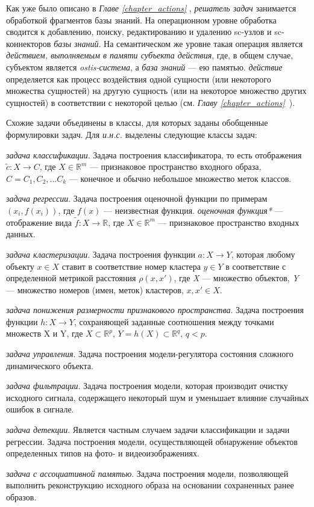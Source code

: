 Как уже было описано в \textit{Главе \ref{chapter_actions} }, \textit{решатель задач} занимается обработкой фрагментов базы знаний. На операционном уровне обработка сводится к добавлению, поиску, редактированию и удалению sc-узлов и sc-коннекторов \textit{базы знаний}. На семантическом же уровне такая операция является \textit{действием, выполняемым в памяти субъекта действия}, где, в общем случае, субъектом является \textit{ostis-система}, а \textit{база знаний} --- ею памятью. \textit{действие} определяется как процесс воздействия одной сущности (или некоторого множества сущностей) на другую сущность (или на некоторое множество других сущностей) в соответствии с некоторой целью (см. \textit{Главу \ref{chapter_actions}~}).

Схожие задачи объединены в классы, для которых заданы обобщенные формулировки задач. Для \textit{и.н.с.} выделены следующие классы задач:
\begin{textitemize}
	\item \textit{задача классификации}. Задача построения классификатора, то есть отображения $\tilde c: X \rightarrow C$, где $ X \in \mathbb{R}^m$ --- признаковое пространство входного образа, $C = {C_1, C_2, ...C_k }$ --- конечное и обычно небольшое множество меток классов.
	\item \textit{задача регрессии}. Задача построения оценочной функции по примерам $(x_i, f(x_i))$, где $f(x)$ --- неизвестная функция. \textit{оценочная функция*} --- отображение вида $\tilde{f}: X \rightarrow \mathbb{R}$, где $X \in \mathbb{R}^m$ --- признаковое пространство входных данных.
	\item \textit{задача кластеризации}. Задача построения функции $a: X \rightarrow Y$, которая любому объекту $x \in X$ ставит в соответствие номер кластера $y \in Y$ в соответствие с определенной метрикой расстояния $\rho(x, x')$, где \textit{X} --- множество объектов, \textit{Y} --- множество номеров (имен, меток) кластеров, $x, x' \in X$.
	\item \textit{задача понижения размерности признакового пространства}. Задача построения функции $h: X \rightarrow Y$, сохраняющей заданные соотношения между точками множеств X и Y, где $X \subset \mathbb{R}^p$, $Y=h(X) \subset \mathbb{R}^q$, $q < p$.
	\item \textit{задача управления}. Задача построения модели-регулятора состояния сложного динамического объекта.
	\item \textit{задача фильтрации}. Задача построения модели, которая производит очистку исходного сигнала, содержащего некоторый шум и уменьшает влияние случайных ошибок в сигнале.
	\item \textit{задача детекции}. Является частным случаем задачи классификации и задачи регрессии. Задача построения модели, осуществляющей обнаружение объектов определенных типов на фото- и видеоизображениях.
	\item \textit{задача с ассоциативной памятью}. Задача построения модели, позволяющей выполнить реконструкцию исходного образа на основании сохраненных ранее образов.
\end{textitemize}

